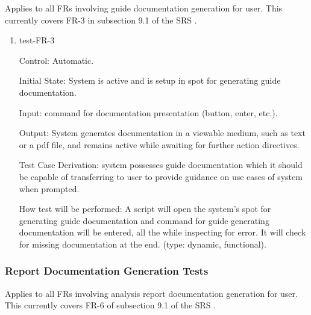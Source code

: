 \documentclass[12pt, titlepage]{article}
\begin{document}
Applies to all FRs involving guide documentation generation for user. This 
currently covers FR-3 in subsection 9.1 of the SRS \citep{SRS}.

\begin{enumerate}

\item{test-FR-3\\}

Control: Automatic.
					
Initial State: System is active and is setup in spot for generating guide 
documentation.
					
Input: command for documentation presentation (button, enter, etc.).
					
Output: System generates documentation in a viewable medium, such as text or a 
pdf file, and remains active while awaiting for further action directives.

Test Case Derivation: system possesses guide documentation which it should be 
capable of transferring to user to provide guidance on use cases of system 
when prompted.

How test will be performed: A script will open the system's spot for generating 
guide documentation and command for guide generating documentation will be 
entered, all the while inspecting for error. It will check for missing 
documentation at the end. (type: dynamic, functional).				

\end{enumerate}

\subsubsection{Report Documentation Generation Tests}

Applies to all FRs involving analysis report documentation generation for 
user. This currently covers FR-6 of subsection 9.1 of the SRS \citep{SRS}.
\end{document}
